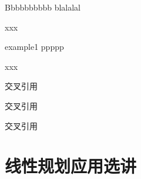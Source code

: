 \documentclass[12pt,oneside,UTF8]{ctexbook} %
\begin{document}
\begin{spacing}{1.5}

\begin{theorem}{Bbbbb}{bbbbb}
    blalalal
\end{theorem}

\begin{thmproof}
    xxx
\end{thmproof}

\begin{example}{}{example1}
    ppppp
\end{example}

\begin{exasolution}
    xxx
\end{exasolution}

交叉引用

交叉引用

交叉引用

\part{线性规划应用选讲}







% 


% 

% 

% 





\end{spacing}
\end{document}
